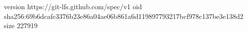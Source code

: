 version https://git-lfs.github.com/spec/v1
oid sha256:69b6dcafc3376b23e86a04ae06b861a6d119897793217bcf978c137be3e138d2
size 227919

